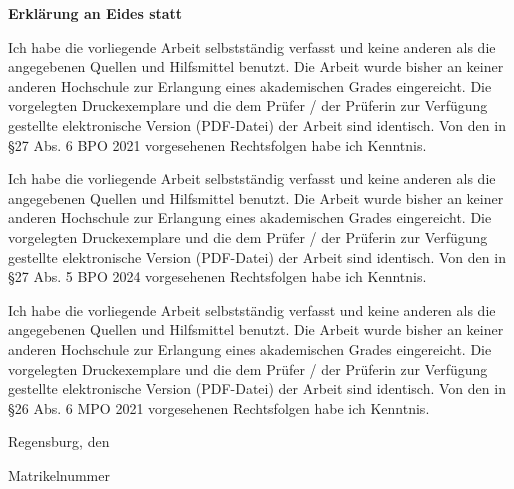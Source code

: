 \documentclass[11pt,a4paper,english,notitlepage]{report}
\begin{document}
\textbf{\large{Erklärung an Eides statt}}

 \vspace*{65pt}

\ifx \erklaerung\BPOone
Ich habe die vorliegende Arbeit selbstständig verfasst und keine anderen als die angegebenen Quellen und Hilfsmittel benutzt. Die Arbeit wurde bisher an keiner anderen Hochschule zur Erlangung eines akademischen Grades eingereicht. Die vorgelegten Druckexemplare und die dem Prüfer / der Prüferin zur Verfügung gestellte elektronische Version (PDF-Datei) der Arbeit sind identisch. Von den in §27 Abs. 6 BPO 2021 vorgesehenen Rechtsfolgen habe ich Kenntnis.
\fi

\ifx \erklaerung\BPOtwo
Ich habe die vorliegende Arbeit selbstständig verfasst und keine anderen als die angegebenen Quellen und Hilfsmittel benutzt. Die Arbeit wurde bisher an keiner anderen Hochschule zur Erlangung eines akademischen Grades eingereicht. Die vorgelegten Druckexemplare und die dem Prüfer / der Prüferin zur Verfügung gestellte elektronische Version (PDF-Datei) der Arbeit sind identisch. Von den in §27 Abs. 5 BPO 2024 vorgesehenen Rechtsfolgen habe ich Kenntnis. 
\fi

\ifx \erklaerung\MPO
Ich habe die vorliegende Arbeit selbstständig verfasst und keine anderen als die angegebenen Quellen und Hilfsmittel benutzt. Die Arbeit wurde bisher an keiner anderen Hochschule zur Erlangung eines akademischen Grades eingereicht. Die vorgelegten Druckexemplare und die dem Prüfer / der Prüferin zur Verfügung gestellte elektronische Version (PDF-Datei) der Arbeit sind identisch. Von den in §26 Abs. 6 MPO 2021 vorgesehenen Rechtsfolgen habe ich Kenntnis.
\fi

\vspace*{65pt}

Regensburg, den \submissiondate

\vspace*{60pt}

\authorname

Matrikelnummer \studentID

\fi
\end{document}

